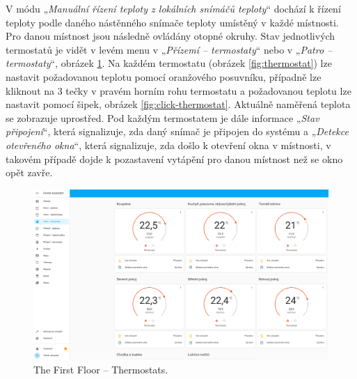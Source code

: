 \begin{Czech}
V módu „\textit{Manuální řízení teploty z lokálních snímáčů teploty}“ dochází k řízení teploty podle daného nástěnného snímače teploty umístěný v každé místnosti. Pro danou místnost jsou následně ovládány otopné okruhy. Stav jednotlivých termostatů je vidět v levém menu v „\textit{Přízemí – termostaty}“ nebo v „\textit{Patro – termostaty}“, obrázek \ref{fig:thermostats-first-floor}. Na každém termostatu (obrázek \ref{fig:thermostat}) lze nastavit požadovanou teplotu pomocí oranžového posuvníku, případně lze kliknout na 3 tečky v pravém horním rohu termostatu a požadovanou teplotu lze nastavit pomocí šipek, obrázek \ref{fig:click-thermostat}. Aktuálně naměřená teplota se zobrazuje uprostřed. Pod každým termostatem je dále informace „\textit{Stav připojení}“, která signalizuje, zda daný snímač je připojen do systému a „\textit{Detekce otevřeného okna}“, která signalizuje, zda došlo k otevření okna v místnosti, v takovém případě dojde k pozastavení vytápění pro danou místnost než se okno opět zavře.
\end{Czech}


\begin{English}
\begin{figure}[H]
    \centering
    \includegraphics[width=1\textwidth]{pictures/czech/software/thermostats-first-floor.png}
    \caption{The First Floor – Thermostats.}
    \label{fig:thermostats-first-floor}
\end{figure}
\end{English}

